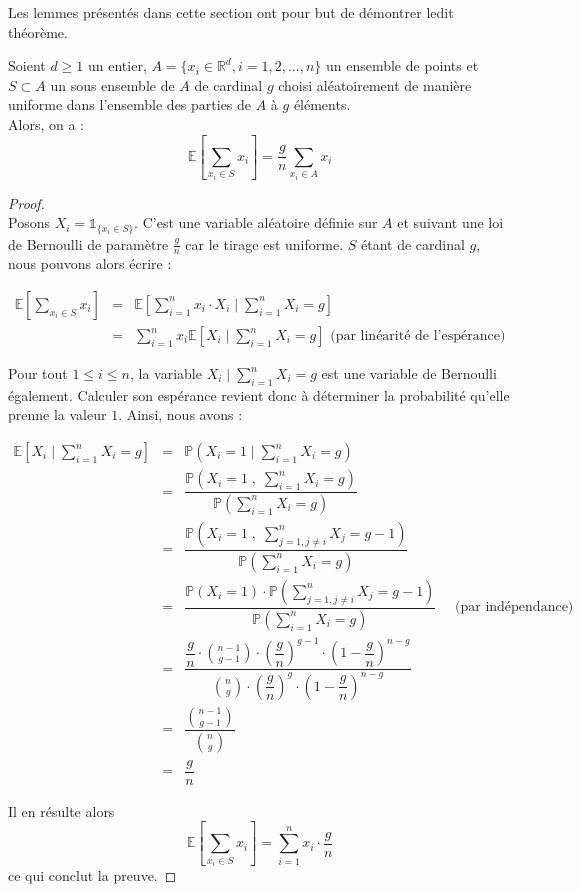 \documentclass[12pt,a4paper]{book}
\newcommand{\R}{\mathbb{R}}
\newcommand{\E}{\mathbb{E}}
\newcommand{\p}{\mathbb{P}}
\newcommand{\1}{\mathds{1}}
\begin{document}
Les lemmes présentés dans cette section ont pour but de démontrer ledit théorème.

	\begin{env_lemme}\label{lemme4.3}
		Soient $d \geq 1$ un entier, $A = \{ x_i \in \R^d, i=1,2, ..., n \}$ un ensemble de points et $S \subset A$ un sous ensemble de $A$ de cardinal $g$ choisi aléatoirement de manière uniforme dans l'ensemble des parties de $A$ à $g$ éléments.\\
		Alors, on a :
		$$
			\E \left[ \sum_{x_i \in S} x_i \right] = \frac{g}{n} \sum_{x_i \in A} x_i
		$$		
	\end{env_lemme}	
	
	\begin{proof}
		~\\
		Posons $X_i = \1_{\{x_i \in S\}}$. C'est une variable aléatoire définie sur $A$ et suivant une loi de Bernoulli de paramètre $\frac{g}{n}$ car le tirage est uniforme. $S$ étant de cardinal $g$, nous pouvons alors écrire :
		
		\begin{eqnarray*}
			\E \left[ \sum_{x_i \in S} x_i \right] &=& \E \left[ \sum_{i=1}^n x_i \cdot X_i \; | \; \sum_{i=1}^n X_i = g \right]\\
			&=& \sum_{i=1}^n x_i \E \left[ X_i \; | \; \sum_{i=1}^n X_i = g \right]  \textrm{ (par linéarité de l'espérance)}
		\end{eqnarray*}
		
		Pour tout $1 \leq i \leq n$, la variable $X_i \; | \; \sum_{i=1}^n X_i = g$  est une variable de Bernoulli également. Calculer son espérance revient donc à déterminer la probabilité qu'elle prenne la valeur $1$. Ainsi, nous avons :
		
		\begin{eqnarray*}
			\E \left[ X_i \; | \; \sum_{i=1}^n X_i = g \right] &=& \p \left( X_i = 1 \; | \; \sum_{i=1}^n X_i = g \right) \\
			&=& \dfrac{\p \left( X_i = 1 \; , \; \displaystyle \sum_{i=1}^n X_i = g \right)}{\p \left(\displaystyle \sum_{i=1}^n X_i = g \right)} \\
			&=& \dfrac{\p \left( X_i = 1 \; , \; \displaystyle \sum_{j=1, j\neq i}^n X_j = g-1 \right)}{\p \left(\displaystyle \sum_{i=1}^n X_i = g \right)} \\
			&=& \dfrac{\p \left( X_i = 1 \right) \cdot \p \left( \displaystyle \sum_{j=1, j\neq i}^n X_j = g-1 \right)}{\p \left(\displaystyle \sum_{i=1}^n X_i = g \right)}  \quad \textrm{  (par indépendance)} \\
			&=& \dfrac{\dfrac{g}{n} \cdot \displaystyle {n-1 \choose g-1} \cdot \left(\dfrac{g}{n}\right)^{g-1} \cdot \left(1 - \dfrac{g}{n}\right)^{n-g} } {\displaystyle {n \choose g} \cdot \left(\dfrac{g}{n}\right)^{g} \cdot \left(1 - \dfrac{g}{n}\right)^{n-g} } \\
			&=& \dfrac{\displaystyle {n-1 \choose g-1}} {\displaystyle {n \choose g}} \\
			&=& \dfrac{g}{n}
		\end{eqnarray*}
		
		Il en résulte alors 
		$$
			\E \left[ \sum_{x_i \in S} x_i \right] = \sum_{i=1}^n x_i  \cdot \dfrac{g}{n}
		$$
		ce qui conclut la preuve.
	\end{proof}
\end{document}
